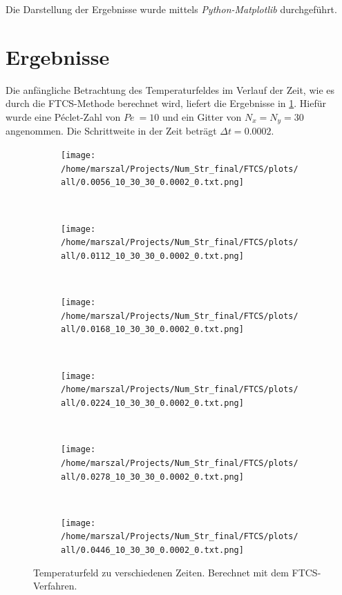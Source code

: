 Die Darstellung der Ergebnisse wurde mittels \emph{Python-Matplotlib} durchgeführt.


\FloatBarrier
\newpage
\section{Ergebnisse}
Die anfängliche Betrachtung des Temperaturfeldes im Verlauf der Zeit, wie es durch die FTCS-Methode berechnet wird, liefert die Ergebnisse in \cref{fig:FTCSnaive}. Hiefür wurde eine Péclet-Zahl von $Pe~=10$ und ein Gitter von $N_x=N_y=30$ angenommen. Die Schrittweite in der Zeit beträgt $\Delta t=0.0002$.

\begin{figure}
\centering
  \begin{subfigure}[b]{0.35\textwidth}
    \texttt{[image: /home/marszal/Projects/Num\_Str\_final/FTCS/plots/all/0.0056\_10\_30\_30\_0.0002\_0.txt.png]}
  \end{subfigure}
  ~
  \begin{subfigure}[b]{0.35\textwidth}
    \texttt{[image: /home/marszal/Projects/Num\_Str\_final/FTCS/plots/all/0.0112\_10\_30\_30\_0.0002\_0.txt.png]}
  \end{subfigure}
  \\
  \begin{subfigure}[b]{0.35\textwidth}
    \texttt{[image: /home/marszal/Projects/Num\_Str\_final/FTCS/plots/all/0.0168\_10\_30\_30\_0.0002\_0.txt.png]}
  \end{subfigure}
  ~
  \begin{subfigure}[b]{0.35\textwidth}
    \texttt{[image: /home/marszal/Projects/Num\_Str\_final/FTCS/plots/all/0.0224\_10\_30\_30\_0.0002\_0.txt.png]}
  \end{subfigure}
  \\
  \begin{subfigure}[b]{0.35\textwidth}
    \texttt{[image: /home/marszal/Projects/Num\_Str\_final/FTCS/plots/all/0.0278\_10\_30\_30\_0.0002\_0.txt.png]}
  \end{subfigure}
  ~
  \begin{subfigure}[b]{0.35\textwidth}
    \texttt{[image: /home/marszal/Projects/Num\_Str\_final/FTCS/plots/all/0.0446\_10\_30\_30\_0.0002\_0.txt.png]}
  \end{subfigure}
\caption{Temperaturfeld zu verschiedenen Zeiten. Berechnet mit dem FTCS-Verfahren.}\label{fig:FTCSnaive}
\end{figure}
\FloatBarrier
\newpage
